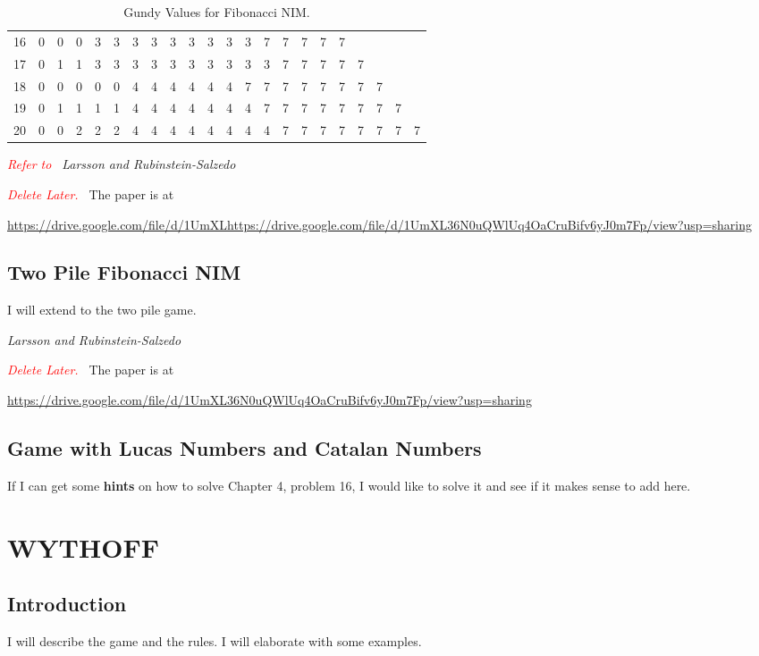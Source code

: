 \documentclass[11pt,twoside]{scrartcl}
\newcommand{\TODO}[1]{\emph{\textcolor{red}{#1\ }}}
\begin{document}
\begin{table}[h]
\begin{tabular}{c|*{21}c}
    16 & 0 & 0 & 0 & 3 & 3 & 3 & 3 & 3 & 3 & 3 & 3  & 3  & 7  & 7  & 7  & 7  & 7  &    &    &    &     \\
    17 & 0 & 1 & 1 & 3 & 3 & 3 & 3 & 3 & 3 & 3 & 3  & 3  & 3  & 7  & 7  & 7  & 7  & 7  &    &    &     \\
    18 & 0 & 0 & 0 & 0 & 0 & 4 & 4 & 4 & 4 & 4 & 4  & 7  & 7  & 7  & 7  & 7  & 7  & 7  & 7  &    &     \\
    19 & 0 & 1 & 1 & 1 & 1 & 4 & 4 & 4 & 4 & 4 & 4  & 4  & 7  & 7  & 7  & 7  & 7  & 7  & 7  & 7  &     \\
    20 & 0 & 0 & 2 & 2 & 2 & 4 & 4 & 4 & 4 & 4 & 4  & 4  & 4  & 7  & 7  & 7  & 7  & 7  & 7  & 7  & 7  \\
    \hline
    \end{tabular}
    \caption{\label{tab:gvals}Gundy Values for Fibonacci NIM.}
    \end{table}

\TODO{Refer to} \textit{Larsson and Rubinstein-Salzedo \cite{simon1}}
\begin{remark}
    \TODO{Delete Later.} The paper is at 
    
    \url{https://drive.google.com/file/d/1UmXLhttps://drive.google.com/file/d/1UmXL36N0uQWlUq4OaCruBifv6yJ0m7Fp/view?usp=sharing}
\end{remark}

\subsection{Two Pile Fibonacci NIM}
I will extend to the two pile game.

\textit{Larsson and Rubinstein-Salzedo \cite{simon2}}
\begin{remark}
    \TODO{Delete Later.} The paper is at 
    
    \url{https://drive.google.com/file/d/1UmXL36N0uQWlUq4OaCruBifv6yJ0m7Fp/view?usp=sharing}
\end{remark}
\subsection{Game with Lucas Numbers and Catalan Numbers}
If I can get some \textbf{hints} on how to solve Chapter 4, problem 16, I would like to solve it and see if it makes sense to add here.

\section{WYTHOFF}
\subsection{Introduction}
I will describe the game and the rules. I will elaborate with some examples.
\end{document}
